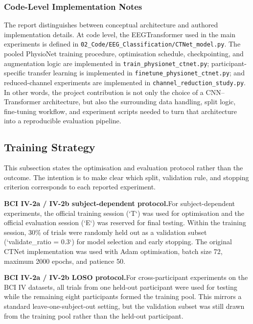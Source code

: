 \documentclass[12pt, a4paper]{article}
\begin{document}
\subsubsection{Code-Level Implementation Notes}

The report distinguishes between conceptual architecture and authored implementation details. At code level, the EEGTransformer used in the main experiments is defined in \texttt{02\_Code/EEG\_Classification/CTNet\_model.py}. The pooled PhysioNet training procedure, optimisation schedule, checkpointing, and augmentation logic are implemented in \texttt{train\_physionet\_ctnet.py}; participant-specific transfer learning is implemented in \texttt{finetune\_physionet\_ctnet.py}; and reduced-channel experiments are implemented in \texttt{channel\_reduction\_study.py}. In other words, the project contribution is not only the choice of a CNN--Transformer architecture, but also the surrounding data handling, split logic, fine-tuning workflow, and experiment scripts needed to turn that architecture into a reproducible evaluation pipeline.

\subsection{Training Strategy}

This subsection states the optimisation and evaluation protocol rather than the outcome. The intention is to make clear which split, validation rule, and stopping criterion corresponds to each reported experiment.

\textbf{BCI IV-2a / IV-2b subject-dependent protocol.}\quad For subject-dependent experiments, the official training session (`T`) was used for optimisation and the official evaluation session (`E`) was reserved for final testing. Within the training session, 30\% of trials were randomly held out as a validation subset (`validate\_ratio = 0.3`) for model selection and early stopping. The original CTNet implementation was used with Adam optimisation, batch size 72, maximum 2000 epochs, and patience 50.

\textbf{BCI IV-2a / IV-2b LOSO protocol.}\quad For cross-participant experiments on the BCI IV datasets, all trials from one held-out participant were used for testing while the remaining eight participants formed the training pool. This mirrors a standard leave-one-subject-out setting, but the validation subset was still drawn from the training pool rather than the held-out participant.
\end{document}

